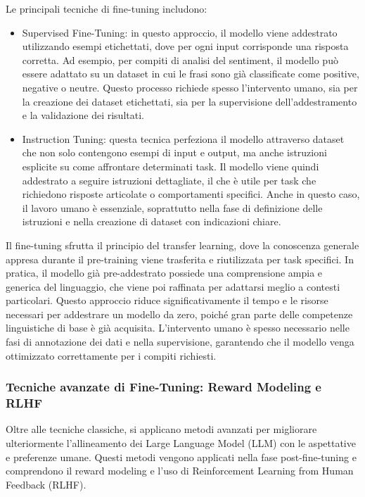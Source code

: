 \documentclass[target=mst,aauheader=,style=]{thud}
\begin{document}
Le principali tecniche di fine-tuning includono:

\begin{itemize}
    \item Supervised Fine-Tuning: in questo approccio, il modello viene addestrato utilizzando esempi etichettati, dove per ogni input corrisponde una risposta corretta. Ad esempio, per compiti di analisi del sentiment, il modello può essere adattato su un dataset in cui le frasi sono già classificate come positive, negative o neutre. Questo processo richiede spesso l’intervento umano, sia per la creazione dei dataset etichettati, sia per la supervisione dell'addestramento e la validazione dei risultati.
    \item Instruction Tuning: questa tecnica perfeziona il modello attraverso dataset che non solo contengono esempi di input e output, ma anche istruzioni esplicite su come affrontare determinati task. Il modello viene quindi addestrato a seguire istruzioni dettagliate, il che è utile per task che richiedono risposte articolate o comportamenti specifici. Anche in questo caso, il lavoro umano è essenziale, soprattutto nella fase di definizione delle istruzioni e nella creazione di dataset con indicazioni chiare.
\end{itemize}

Il fine-tuning sfrutta il principio del transfer learning, dove la conoscenza generale appresa durante il pre-training viene trasferita e riutilizzata per task specifici. In pratica, il modello già pre-addestrato possiede una comprensione ampia e generica del linguaggio, che viene poi raffinata per adattarsi meglio a contesti particolari. Questo approccio riduce significativamente il tempo e le risorse necessari per addestrare un modello da zero, poiché gran parte delle competenze linguistiche di base è già acquisita. L'intervento umano è spesso necessario nelle fasi di annotazione dei dati e nella supervisione, garantendo che il modello venga ottimizzato correttamente per i compiti richiesti.

\subsubsection{Tecniche avanzate di Fine-Tuning: Reward Modeling e RLHF}
Oltre alle tecniche classiche, si applicano metodi avanzati per migliorare ulteriormente l’allineamento dei Large Language Model (LLM) con le aspettative e preferenze umane. Questi metodi vengono applicati nella fase post-fine-tuning e comprendono il reward modeling e l’uso di Reinforcement Learning from Human Feedback (RLHF).
\end{document}
